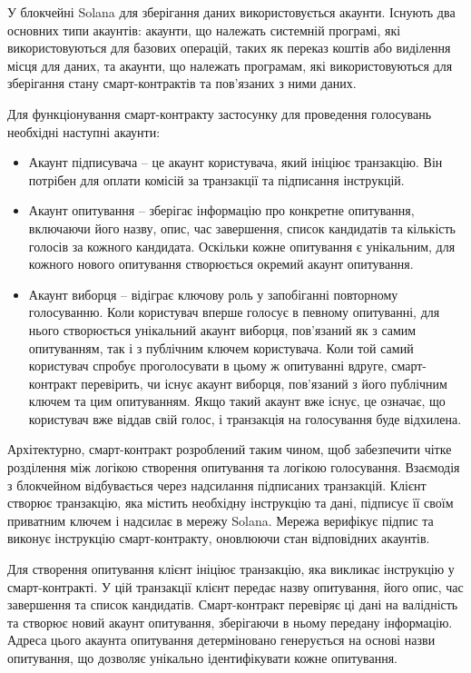 \documentclass[14pt]{extreport}
\begin{document}
  У блокчейні Solana для зберігання даних використовується акаунти. Існують два основних типи акаунтів: акаунти, що належать системній програмі, які використовуються для базових операцій, таких як переказ коштів або виділення місця для даних, та акаунти, що належать програмам, які використовуються для зберігання стану смарт-контрактів та пов'язаних з ними даних.
  
  Для функціонування смарт-контракту застосунку для проведення голосувань необхідні наступні акаунти:
  
  \begin{itemize}
    \item Акаунт підписувача – це акаунт користувача, який ініціює транзакцію. Він потрібен для оплати комісій за транзакції та підписання інструкцій.
    \item Акаунт опитування – зберігає інформацію про конкретне опитування, включаючи його назву, опис, час завершення, список кандидатів та кількість голосів за кожного кандидата. Оскільки кожне опитування є унікальним, для кожного нового опитування створюється окремий акаунт опитування.
    \item Акаунт виборця – відіграє ключову роль у запобіганні повторному голосуванню. Коли користувач вперше голосує в певному опитуванні, для нього створюється унікальний акаунт виборця, пов'язаний як з самим опитуванням, так і з публічним ключем користувача. Коли той самий користувач спробує проголосувати в цьому ж опитуванні вдруге, смарт-контракт перевірить, чи існує акаунт виборця, пов'язаний з його публічним ключем та цим опитуванням. Якщо такий акаунт вже існує, це означає, що користувач вже віддав свій голос, і транзакція на голосування буде відхилена.
  \end{itemize}
  
  Архітектурно, смарт-контракт розроблений таким чином, щоб забезпечити чітке розділення між логікою створення опитування та логікою голосування. Взаємодія з блокчейном відбувається через надсилання підписаних транзакцій. Клієнт створює транзакцію, яка містить необхідну інструкцію та дані, підписує її своїм приватним ключем і надсилає в мережу Solana. Мережа верифікує підпис та виконує інструкцію смарт-контракту, оновлюючи стан відповідних акаунтів.

  Для створення опитування клієнт ініціює транзакцію, яка викликає інструкцію у смарт-контракті. У цій транзакції клієнт передає назву опитування, його опис, час завершення та список кандидатів. Смарт-контракт перевіряє ці дані на валідність та створює новий акаунт опитування, зберігаючи в ньому передану інформацію. Адреса цього акаунта опитування детерміновано генерується на основі назви опитування, що дозволяє унікально ідентифікувати кожне опитування.
\end{document}
